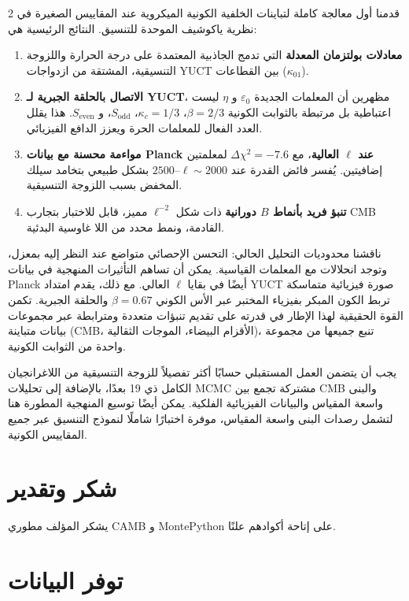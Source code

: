 \documentclass[11pt,a4paper]{article}
\begin{document}
\begin{multicols}{2}
		قدمنا أول معالجة كاملة لتباينات الخلفية الكونية الميكروية عند المقاييس الصغيرة في نظرية ياكوشيف الموحدة للتنسيق. النتائج الرئيسية هي:
		\begin{enumerate}
			\item \textbf{معادلات بولتزمان المعدلة} التي تدمج الجاذبية المعتمدة على درجة الحرارة واللزوجة التنسيقية، المشتقة من ازدواجات YUCT بين القطاعات ($\kappa_{01}$).
			\item \textbf{الاتصال بالحلقة الجبرية لـ YUCT}، مظهرين أن المعلمات الجديدة $\varepsilon_0$ و $\eta$ ليست اعتباطية بل مرتبطة بالثوابت الكونية $\beta=2/3$، $\kappa_c=1/3$، $S_{\mathrm{odd}}$، و $S_{\mathrm{even}}$. هذا يقلل العدد الفعال للمعلمات الحرة ويعزز الدافع الفيزيائي.
			\item \textbf{مواءمة محسنة مع بيانات Planck عند $\ell$ العالية}، مع $\Delta\chi^2 = -7.6$ لمعلمتين إضافيتين. يُفسر فائض القدرة عند $\ell \sim 2000$--$2500$ بشكل طبيعي بتخامد سيلك المخفض بسبب اللزوجة التنسيقية.
			\item \textbf{تنبؤ فريد بأنماط $B$ دورانية} ذات شكل $\ell^{-2}$ مميز، قابل للاختبار بتجارب CMB القادمة، ونمط محدد من اللا غاوسية البدئية.
		\end{enumerate}
		
		ناقشنا محدوديات التحليل الحالي: التحسن الإحصائي متواضع عند النظر إليه بمعزل، وتوجد انحلالات مع المعلمات القياسية. يمكن أن تساهم التأثيرات المنهجية في بيانات Planck أيضًا في بقايا $\ell$ العالي. مع ذلك، يقدم امتداد YUCT صورة فيزيائية متماسكة تربط الكون المبكر بفيزياء المختبر عبر الأس الكوني $\beta = 0.67$ والحلقة الجبرية. تكمن القوة الحقيقية لهذا الإطار في قدرته على تقديم تنبؤات متعددة ومترابطة عبر مجموعات بيانات متباينة (CMB، الأقزام البيضاء، الموجات الثقالية)، تنبع جميعها من مجموعة واحدة من الثوابت الكونية.
		
		يجب أن يتضمن العمل المستقبلي حسابًا أكثر تفصيلاً للزوجة التنسيقية من اللاغرانجيان الكامل ذي 19 بعدًا، بالإضافة إلى تحليلات MCMC مشتركة تجمع بين CMB والبنى واسعة المقياس والبيانات الفيزيائية الفلكية. يمكن أيضًا توسيع المنهجية المطورة هنا لتشمل رصدات البنى واسعة المقياس، موفرة اختبارًا شاملًا لنموذج التنسيق عبر جميع المقاييس الكونية.
		
		\section*{شكر وتقدير}
		
		يشكر المؤلف مطوري CAMB و MontePython على إتاحة أكوادهم علنًا.
		
		\section*{توفر البيانات}
		

\end{multicols}
\end{document}
